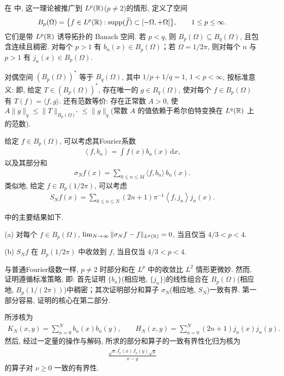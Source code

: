 在 \cite{b131} 中, 这一理论被推广到 $L^{p}(\mathbb{R})$($p \neq 2$)的情形, 定义了空间
\begin{align*}
  B_{p}(\Omega)=\bigl\{f\in L^{p}(\mathbb{R}):\operatorname{supp}(\widehat{f})\subset[-\Omega,+\Omega]\bigr\},\qquad 1\leq p\leq\infty.
\end{align*}
它们是带 $L^p(\mathbb{R})$ 诱导拓扑的 Banach 空间. 若 $p < q$, 则 $B_p(\Omega) \subseteq B_q(\Omega)$, 且包含连续且稠密. 对每个 $p > 1$ 有 $b_n(x) \in B_p(\Omega)$；若 $\Omega = 1/2\pi$, 则对每个 $n$ 与 $p > 1$ 有 $j_n(x) \in B_p(\Omega)$.

对偶空间 $(B_p(\Omega))^*$ 等于 $B_q(\Omega)$, 其中 $1/p + 1/q = 1$, $1 < p < \infty$, 按标准意义: 即, 给定 $T \in (B_p(\Omega))^*$, 存在唯一的 $g \in B_q(\Omega)$, 使对每个 $f \in B_p(\Omega)$ 有 $T(f) = \langle f, g \rangle$. 还有范数等价: 存在正常数 $A > 0$, 使 $A\|g\|_q \leq \|T\|_{B_p(\Omega)^*} \leq \|g\|_q$(常数 $A$ 的值依赖于希尔伯特变换在 $L^q(\mathbb{R})$ 上的范数).

给定 $f \in B_p(\Omega)$, 可以考虑其Fourier系数
\begin{align*}
  \left\langle f,b_{n}\right\rangle=\int f(x)b_{n}(x)\,\mathrm{d}x,
\end{align*}
以及其部分和
\begin{align*}
  \sigma_{N}f(x)=\sum_{0\leq n\leq M}\langle f,b_{n}\rangle\,b_{n}(x).
\end{align*}
类似地, 给定 $f \in B_p(1/2\pi)$, 可以考虑
\begin{align*}
  S_{N}f(x)=\sum_{0\leq n\leq N}(2n+1)\pi^{-1}\left\langle f,j_{n}\right\rangle j_{n}(x).
\end{align*}

\cite{b131} 中的主要结果如下.

\begin{theorem}\label{thm:6.11}
(a) 对每个 $f \in B_p(\Omega)$, $\lim_{N \to \infty}\|\sigma_N f - f\|_{L^p(\mathbb{R})} = 0$, 当且仅当 $4/3 < p < 4$.

(b) $S_N f$ 在 $B_p(1/2\pi)$ 中收敛到 $f$, 当且仅当 $4/3 < p < 4$.
\end{theorem}

与普通Fourier级数一样, $p \neq 2$ 时部分和在 $L^p$ 中的收敛比 $L^2$ 情形更微妙. 然而, 证明遵循标准策略, 即: 首先证明 $\{b_n\}$(相应地, $\{j_n\}$)的线性组合在 $B_p(\Omega)$(相应地, $B_p(1/(2\pi))$)中稠密；其次证明部分和算子 $\sigma_N$(相应地, $S_N$)一致有界. 第一部分容易, 证明的核心在第二部分.

所涉核为
\begin{align*}
  K_{N}(x,y)=\sum_{n=0}^{N}b_{n}(x)b_{n}(y),\qquad
  H_{N}(x,y)=\sum_{n=0}^{N}(2n+1)j_{n}(x)j_{n}(y).
\end{align*}
然后, 经过一定量的操作与解码, 所求的部分和算子的一致有界性化归为核为
\begin{align*}
  \frac{\sqrt{x}J_{\nu}^{\prime}(x)J_{\nu}(y)\sqrt{y}}{x-y}
\end{align*}
的算子对 $\nu \geq 0$ 一致的有界性.

